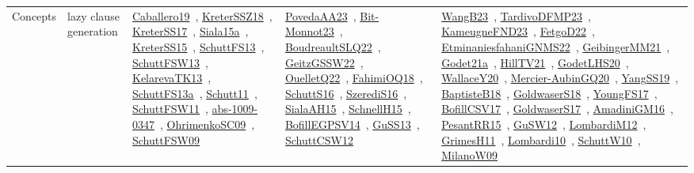 {\begin{longtable}{lp{3cm}>{\raggedright\arraybackslash}p{6cm}>{\raggedright\arraybackslash}p{6cm}>{\raggedright\arraybackslash}p{8cm}}
Concepts & lazy clause generation & \href{works/Caballero19.pdf}{Caballero19}~\cite{Caballero19}, \href{works/KreterSSZ18.pdf}{KreterSSZ18}~\cite{KreterSSZ18}, \href{works/KreterSS17.pdf}{KreterSS17}~\cite{KreterSS17}, \href{works/Siala15a.pdf}{Siala15a}~\cite{Siala15a}, \href{works/KreterSS15.pdf}{KreterSS15}~\cite{KreterSS15}, \href{works/SchuttFS13.pdf}{SchuttFS13}~\cite{SchuttFS13}, \href{works/SchuttFSW13.pdf}{SchuttFSW13}~\cite{SchuttFSW13}, \href{works/KelarevaTK13.pdf}{KelarevaTK13}~\cite{KelarevaTK13}, \href{works/SchuttFS13a.pdf}{SchuttFS13a}~\cite{SchuttFS13a}, \href{works/Schutt11.pdf}{Schutt11}~\cite{Schutt11}, \href{works/SchuttFSW11.pdf}{SchuttFSW11}~\cite{SchuttFSW11}, \href{works/abs-1009-0347.pdf}{abs-1009-0347}~\cite{abs-1009-0347}, \href{works/OhrimenkoSC09.pdf}{OhrimenkoSC09}~\cite{OhrimenkoSC09}, \href{works/SchuttFSW09.pdf}{SchuttFSW09}~\cite{SchuttFSW09} & \href{works/PovedaAA23.pdf}{PovedaAA23}~\cite{PovedaAA23}, \href{works/Bit-Monnot23.pdf}{Bit-Monnot23}~\cite{Bit-Monnot23}, \href{works/BoudreaultSLQ22.pdf}{BoudreaultSLQ22}~\cite{BoudreaultSLQ22}, \href{works/GeitzGSSW22.pdf}{GeitzGSSW22}~\cite{GeitzGSSW22}, \href{works/OuelletQ22.pdf}{OuelletQ22}~\cite{OuelletQ22}, \href{works/FahimiOQ18.pdf}{FahimiOQ18}~\cite{FahimiOQ18}, \href{works/SchuttS16.pdf}{SchuttS16}~\cite{SchuttS16}, \href{works/SzerediS16.pdf}{SzerediS16}~\cite{SzerediS16}, \href{works/SialaAH15.pdf}{SialaAH15}~\cite{SialaAH15}, \href{works/SchnellH15.pdf}{SchnellH15}~\cite{SchnellH15}, \href{works/BofillEGPSV14.pdf}{BofillEGPSV14}~\cite{BofillEGPSV14}, \href{works/GuSS13.pdf}{GuSS13}~\cite{GuSS13}, \href{works/SchuttCSW12.pdf}{SchuttCSW12}~\cite{SchuttCSW12} & \href{works/WangB23.pdf}{WangB23}~\cite{WangB23}, \href{works/TardivoDFMP23.pdf}{TardivoDFMP23}~\cite{TardivoDFMP23}, \href{works/KameugneFND23.pdf}{KameugneFND23}~\cite{KameugneFND23}, \href{works/FetgoD22.pdf}{FetgoD22}~\cite{FetgoD22}, \href{works/EtminaniesfahaniGNMS22.pdf}{EtminaniesfahaniGNMS22}~\cite{EtminaniesfahaniGNMS22}, \href{works/GeibingerMM21.pdf}{GeibingerMM21}~\cite{GeibingerMM21}, \href{works/Godet21a.pdf}{Godet21a}~\cite{Godet21a}, \href{works/HillTV21.pdf}{HillTV21}~\cite{HillTV21}, \href{works/GodetLHS20.pdf}{GodetLHS20}~\cite{GodetLHS20}, \href{works/WallaceY20.pdf}{WallaceY20}~\cite{WallaceY20}, \href{works/Mercier-AubinGQ20.pdf}{Mercier-AubinGQ20}~\cite{Mercier-AubinGQ20}, \href{works/YangSS19.pdf}{YangSS19}~\cite{YangSS19}, \href{works/BaptisteB18.pdf}{BaptisteB18}~\cite{BaptisteB18}, \href{works/GoldwaserS18.pdf}{GoldwaserS18}~\cite{GoldwaserS18}, \href{works/YoungFS17.pdf}{YoungFS17}~\cite{YoungFS17}, \href{works/BofillCSV17.pdf}{BofillCSV17}~\cite{BofillCSV17}, \href{works/GoldwaserS17.pdf}{GoldwaserS17}~\cite{GoldwaserS17}, \href{works/AmadiniGM16.pdf}{AmadiniGM16}~\cite{AmadiniGM16}, \href{works/PesantRR15.pdf}{PesantRR15}~\cite{PesantRR15}, \href{works/GuSW12.pdf}{GuSW12}~\cite{GuSW12}, \href{works/LombardiM12.pdf}{LombardiM12}~\cite{LombardiM12}, \href{works/GrimesH11.pdf}{GrimesH11}~\cite{GrimesH11}, \href{works/Lombardi10.pdf}{Lombardi10}~\cite{Lombardi10}, \href{works/SchuttW10.pdf}{SchuttW10}~\cite{SchuttW10}, \href{works/MilanoW09.pdf}{MilanoW09}~\cite{MilanoW09}\\

\end{longtable}}
